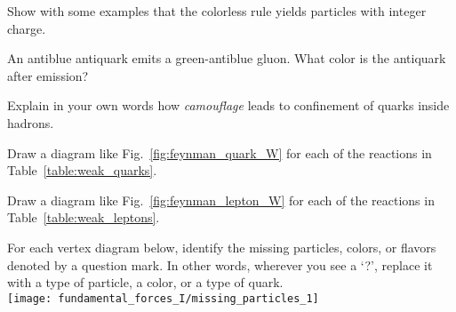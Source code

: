 \begin{problem}
Show with some examples that the colorless rule yields particles
  with integer charge.
\label{prob:colorless_rule}
\end{problem}

\begin{problem}
An antiblue antiquark emits a green-antiblue gluon.  What color
  is the antiquark after emission?
\label{prob:quark_color}
\end{problem}

\begin{problem}
Explain in your own words how {\em camouflage} leads to
confinement of quarks inside hadrons.
\label{prob:camouflage}
\end{problem}

\begin{problem} 
Draw a diagram like Fig.~\ref{fig:feynman_quark_W} for each of
the reactions in Table~\ref{table:weak_quarks}.
\label{problem:gumby_quark_W}
\label{prob:gumby_ii}
\end{problem}

\begin{problem}
Draw a diagram like Fig.~\ref{fig:feynman_lepton_W} for each of
the reactions in Table~\ref{table:weak_leptons}. 
\label{problem:gumby_lepton_W}
\label{prob:gumby_iii}
\end{problem}

\begin{problem} 
For each vertex diagram below, identify the missing particles,
colors, or flavors denoted by a question mark.  In other words,
wherever you see a `?', replace it with a type of particle, a color,
or a type of quark.\\
\texttt{[image: fundamental\_forces\_I/missing\_particles\_1]}
\label{prob:identify_missing_property}
\end{problem}

